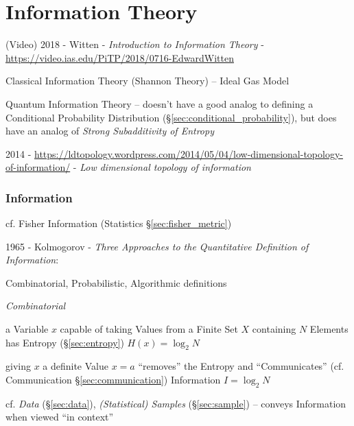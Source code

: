 \part{Information Theory}\label{part:information_theory}

\cite{shannon48}

(Video) 2018 - Witten - \emph{Introduction to Information Theory} -
\url{https://video.ias.edu/PiTP/2018/0716-EdwardWitten}

Classical Information Theory (Shannon Theory) -- Ideal Gas Model

Quantum Information Theory -- doesn't have a good analog to defining a
Conditional Probability Distribution (\S\ref{sec:conditional_probability}), but
does have an analog of \emph{Strong Subadditivity of Entropy}

2014 -
\url{https://ldtopology.wordpress.com/2014/05/04/low-dimensional-topology-of-information/} -
\emph{Low dimensional topology of information}



\section{Information}\label{sec:information}

\fist cf. Fisher Information (Statistics \S\ref{sec:fisher_metric})

1965 - Kolmogorov -
\emph{Three Approaches to the Quantitative Definition of Information}:

Combinatorial, Probabilistic, Algorithmic definitions

\emph{Combinatorial}

a Variable $x$ capable of taking Values from a Finite Set $X$ containing $N$
Elements has Entropy (\S\ref{sec:entropy}) $H(x) = \log_2 N$

giving $x$ a definite Value $x = a$ ``removes'' the Entropy and ``Communicates''
(cf. Communication \S\ref{sec:communication}) Information $I = \log_2 N$

\fist cf. \emph{Data} (\S\ref{sec:data}), \emph{(Statistical) Samples}
(\S\ref{sec:sample}) -- conveys Information when viewed ``in context''



